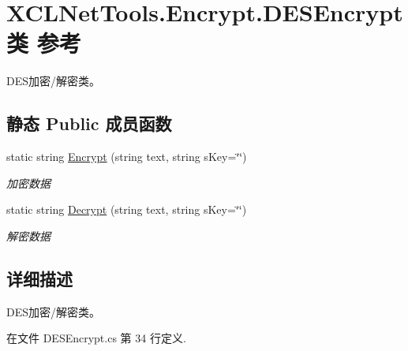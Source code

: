 \hypertarget{class_x_c_l_net_tools_1_1_encrypt_1_1_d_e_s_encrypt}{\section{X\-C\-L\-Net\-Tools.\-Encrypt.\-D\-E\-S\-Encrypt类 参考}
\label{class_x_c_l_net_tools_1_1_encrypt_1_1_d_e_s_encrypt}
}


D\-E\-S加密/解密类。  


\subsection*{静态 Public 成员函数}
\begin{DoxyCompactItemize}
\item 
static string \hyperlink{class_x_c_l_net_tools_1_1_encrypt_1_1_d_e_s_encrypt_a5bd946e26e2f43cc6b2d999df6b9d88d}{Encrypt} (string text, string s\-Key=\char`\"{}\char`\"{})
\begin{DoxyCompactList}\small\item\em 加密数据 \end{DoxyCompactList}\item 
static string \hyperlink{class_x_c_l_net_tools_1_1_encrypt_1_1_d_e_s_encrypt_a2455ab42f563bee03bf39c6f6eb9b2d1}{Decrypt} (string text, string s\-Key=\char`\"{}\char`\"{})
\begin{DoxyCompactList}\small\item\em 解密数据 \end{DoxyCompactList}\end{DoxyCompactItemize}


\subsection{详细描述}
D\-E\-S加密/解密类。 



在文件 D\-E\-S\-Encrypt.\-cs 第 34 行定义.



